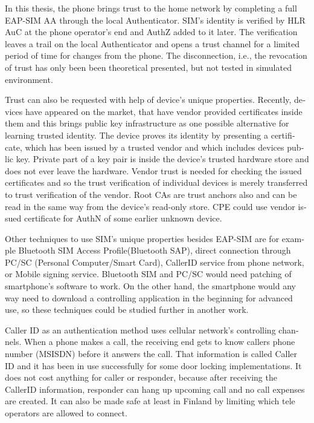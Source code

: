 \documentclass[12pt,a4paper,english]{tutthesis}
\begin{document}
\begin{otherlanguage}{english}
In this thesis,
the phone brings trust to the home network by completing a full EAP-SIM
AA through the local Authenticator. SIM's identity is verified by HLR
AuC at the phone operator's end and AuthZ added to it later. The
verification leaves a trail on the local Authenticator and opens a
trust channel for a limited period of time for changes from the phone.
The disconnection, i.e., the revocation of trust has only been been theoretical presented,
but not tested in simulated environment.




Trust can also be requested with help of device's unique
properties. Recently, devices have appeared on the market, that have
vendor provided certificates inside them and this brings public key
infrastructure as one possible alternative for learning trusted
identity.  The device proves its identity by presenting a certificate,
which has been issued by a trusted vendor and which includes devices
public key.  Private part of a key pair is inside the device's trusted
hardware store and does not ever leave the hardware. Vendor trust is
needed for checking the issued certificates and so the trust
verification of individual devices is merely transferred to trust
verification of the vendor.  Root CAs are trust anchors also and can
be read in the same way from the device's read-only store.  CPE could
use vendor issued certificate for AuthN of some earlier unknown
device.


Other techniques  to use SIM's unique properties besides EAP-SIM
are for example Bluetooth SIM Access Profile(Bluetooth  SAP), 
direct connection through PC/SC (Personal\- Computer/Smart\- Card),
CallerID service from phone network, or
Mobile signing service.
Bluetooth SIM and PC/SC would need patching of smartphone's software
to work.  On the other hand, the smartphone would any way need to
download  a controlling application
in the beginning for advanced use, so these techniques could be
studied further in another work.

Caller ID as an authentication method uses cellular network's controlling
channels. When a phone makes a call, the receiving end gets 
to know callers phone number (MSISDN) before it answers the call.
That information is called Caller ID and it has been in use
successfully for some door locking implementations. 
It does not cost anything for caller or responder,
because after receiving the CallerID  information, responder can hang
up upcoming call and no call expenses are created.
 It can also be made safe at least in Finland
by limiting which tele operators are allowed to connect.















\end{otherlanguage}
\end{document}
